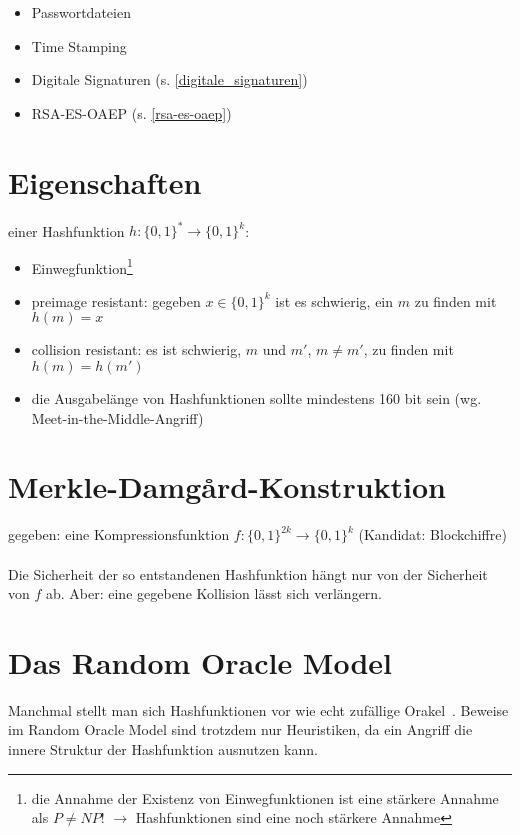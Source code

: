 \documentclass[a4paper,twoside,DIV15,BCOR12mm]{scrbook}
\begin{document}
\begin{itemize}
	\item Passwortdateien
	\item Time Stamping
	\item Digitale Signaturen (s. \ref{digitale_signaturen})
	\item RSA-ES-OAEP (s. \ref{rsa-es-oaep})
\end{itemize}

\section{Eigenschaften}

einer Hashfunktion $h \colon {\{ 0, 1 \}}^* \rightarrow {\{ 0, 1 \}}^k$:

\begin{itemize}
	\item Einwegfunktion\footnote{die Annahme der Existenz von Einwegfunktionen ist eine stärkere Annahme als $P \neq NP$! $\rightarrow$ Hashfunktionen sind eine noch stärkere Annahme}
	\item preimage resistant: gegeben $x \in {\{ 0, 1 \}}^k$ ist es schwierig, ein $m$ zu finden mit $h(m) = x$
	\item collision resistant: es ist schwierig, $m$ und $m'$, $m \neq m'$, zu finden mit $h(m) = h(m')$
	\item die Ausgabelänge von Hashfunktionen sollte mindestens 160 bit sein (wg. Meet-in-the-Middle-Angriff)
\end{itemize}

\section{Merkle-Damg\r{a}rd-Konstruktion}

gegeben: eine Kompressionsfunktion $f \colon {\{ 0, 1 \}}^{2k} \rightarrow {\{ 0, 1 \}}^k$ (Kandidat: Blockchiffre)\\

\\

Die Sicherheit der so entstandenen Hashfunktion hängt nur von der Sicherheit von $f$ ab. Aber: eine gegebene Kollision lässt sich verlängern.

\section{Das Random Oracle Model}

Manchmal stellt man sich Hashfunktionen vor wie echt zufällige \glqq Orakel\grqq\ . Beweise im Random Oracle Model sind trotzdem nur Heuristiken, da ein Angriff die innere Struktur der Hashfunktion ausnutzen kann.
\end{document}
